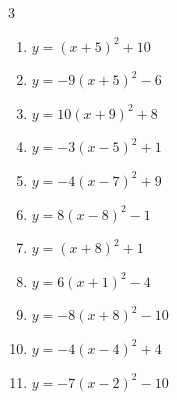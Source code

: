 \begin{multicols}{3}
\begin{enumerate}
\columnbreak %

  \item $\displaystyle y=\left( x+5\right)^{2}+10$

        \phantom{$\displaystyle 頂点\left( -5 , 10 \right)$}

  \item $\displaystyle y=-9\left( x+5\right)^{2}-6$

        \phantom{$\displaystyle 頂点\left( -5 , -6 \right)$}

  \item $\displaystyle y=10\left( x+9\right)^{2}+8$

        \phantom{$\displaystyle 頂点\left( -9 , 8 \right)$}

  \item $\displaystyle y=-3\left( x-5\right)^{2}+1$

        \phantom{$\displaystyle 頂点\left( 5 , 1 \right)$}

  \item $\displaystyle y=-4\left( x-7\right)^{2}+9$

        \phantom{$\displaystyle 頂点\left( 7 , 9 \right)$}

  \item $\displaystyle y=8\left( x-8\right)^{2}-1$

        \phantom{$\displaystyle 頂点\left( 8 , -1 \right)$}

  \item $\displaystyle y=\left( x+8\right)^{2}+1$

        \phantom{$\displaystyle 頂点\left( -8 , 1 \right)$}

  \item $\displaystyle y=6\left( x+1\right)^{2}-4$

        \phantom{$\displaystyle 頂点\left( -1 , -4 \right)$}

  \item $\displaystyle y=-8\left( x+8\right)^{2}-10$

        \phantom{$\displaystyle 頂点\left( -8 , -10 \right)$}

  \item $\displaystyle y=-4\left( x-4\right)^{2}+4$

        \phantom{$\displaystyle 頂点\left( 4 , 4 \right)$}

  \item $\displaystyle y=-7\left( x-2\right)^{2}-10$

        \phantom{$\displaystyle 頂点\left( 2 , -10 \right)$}


\end{enumerate}
\end{multicols}
